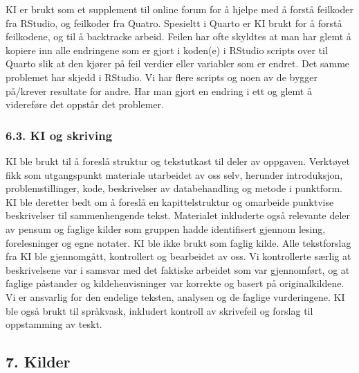 \documentclass[
  letterpaper,
  DIV=11,
  numbers=noendperiod]{scrartcl}
\begin{document}
KI er brukt som et supplement til online forum for å hjelpe med å forstå
feilkoder fra RStudio, og feilkoder fra Quatro. Spesieltt i Quarto er KI
brukt for å forstå feilkodene, og til å backtracke arbeid. Feilen har
ofte skyldtes at man har glemt å kopiere inn alle endringene som er
gjort i koden(e) i RStudio scripts over til Quarto slik at den kjører på
feil verdier eller variabler som er endret. Det samme problemet har
skjedd i RStudio. Vi har flere scripts og noen av de bygger på/krever
resultate for andre. Har man gjort en endring i ett og glemt å
videreføre det oppstår det problemer.

\subsubsection{6.3. KI og skriving}\label{ki-og-skriving}

KI ble brukt til å foreslå struktur og tekstutkast til deler av
oppgaven. Verktøyet fikk som utgangspunkt materiale utarbeidet av oss
selv, herunder introduksjon, problemstillinger, kode, beskrivelser av
databehandling og metode i punktform. KI ble deretter bedt om å foreslå
en kapittelstruktur og omarbeide punktvise beskrivelser til
sammenhengende tekst. Materialet inkluderte også relevante deler av
pensum og faglige kilder som gruppen hadde identifisert gjennom lesing,
forelesninger og egne notater. KI ble ikke brukt som faglig kilde. Alle
tekstforslag fra KI ble gjennomgått, kontrollert og bearbeidet av oss.
Vi kontrollerte særlig at beskrivelsene var i samsvar med det faktiske
arbeidet som var gjennomført, og at faglige påstander og
kildehenvisninger var korrekte og basert på originalkildene. Vi er
ansvarlig for den endelige teksten, analysen og de faglige vurderingene.
KI ble også brukt til språkvask, inkludert kontroll av skrivefeil og
forslag til oppstamming av teskt.

\subsection{7. Kilder}\label{kilder}
\end{document}
